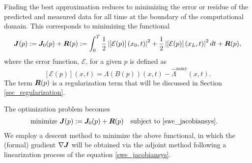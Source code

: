 Finding the best approximation reduces to minimizing the error or residue of the predicted and measured data for all time at the boundary of the computational domain. This corresponds to minimizing the functional 
\begin{equation} \label{cost_funct}
    \bm{J}(p) := \bm{J}_0(p) + \bm{R}(p) := \int_0^T \frac{1}{2}\left|\left[\mathcal{E}(p)\right](x_0,t)\right|^2 + \frac{1}{2}\left|\left[\mathcal{E}(p)\right](x_L,t)\right|^2 dt + \bm{R}(p),
\end{equation}
where the error function, $\mathcal{E}$, for a given $p$ is defined as
\begin{equation} \label{error_funct}
    \left[\mathcal{E}(p)\right] (x,t) = \Lambda(B(p)) (x,t)-\hat{\Lambda}^{\text{noisy}}(x,t).
\end{equation}
The term $\bm{R}(p)$ is a regularization term that will be discussed in Section \ref{sec_regularization}.

The optimization problem becomes
\begin{equation} \label{min_prob}
    \begin{split}
        & \text{minimize } \bm{J}(p) := \bm{J}_0(p) + \bm{R}(p) \quad \text{subject to } \eqref{swe_jacobiansys}.
    \end{split}
\end{equation}
We employ a descent method to minimize the above functional, in which the (formal) gradient  $\nabla \bm{J}$ will be obtained via the adjoint method following a linearization process of the equation \eqref{swe_jacobiansys}. 

